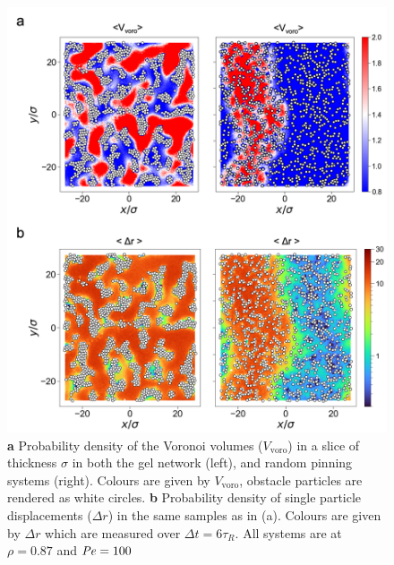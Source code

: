 \begin{figure}
	\centering
	\includegraphics[width=\linewidth]{chapters/activeConfinement/figsActiveConfinement/figHeatmaps.png}
	\caption[Spacial distribution of $\langle V_{\textrm{voro}} \rangle$ and $\langle \Delta r \rangle$ of ABP in the gel and random pinning systems.]{\textbf{a} Probability density of the Voronoi volumes ($V_{\textrm{voro}}$) in a slice of thickness $\sigma$ in both the gel network (left), and random pinning systems (right). Colours are given by $V_{\textrm{voro}}$, obstacle particles are rendered as white circles.  \textbf{b} Probability density of single particle displacements ($\Delta r$) in the same samples as in (a). Colours are given by $\Delta r$ which are measured over $\Delta t = 6 \tau_R$. All systems are at $\rho=0.87$ and $\operatorname{\mathit{P\kern-.08em e}}=100$}
	\label{fig:heatmaps}
\end{figure}

